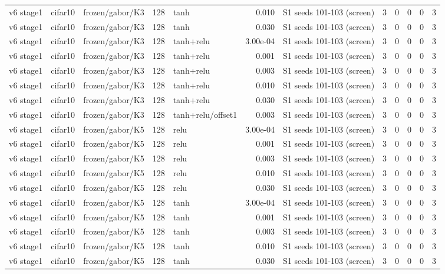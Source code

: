 \begin{table}[htbp]
{\begin{tabular}{@{}lllrlrlrrrrr@{}}
v6 stage1 & cifar10 & frozen/gabor/K3 & 128 & tanh & 0.010 & S1 seeds 101-103 (screen) & 3 & 0 & 0 & 0 & 3 \\
v6 stage1 & cifar10 & frozen/gabor/K3 & 128 & tanh & 0.030 & S1 seeds 101-103 (screen) & 3 & 0 & 0 & 0 & 3 \\
v6 stage1 & cifar10 & frozen/gabor/K3 & 128 & tanh+relu & 3.00e-04 & S1 seeds 101-103 (screen) & 3 & 0 & 0 & 0 & 3 \\
v6 stage1 & cifar10 & frozen/gabor/K3 & 128 & tanh+relu & 0.001 & S1 seeds 101-103 (screen) & 3 & 0 & 0 & 0 & 3 \\
v6 stage1 & cifar10 & frozen/gabor/K3 & 128 & tanh+relu & 0.003 & S1 seeds 101-103 (screen) & 3 & 0 & 0 & 0 & 3 \\
v6 stage1 & cifar10 & frozen/gabor/K3 & 128 & tanh+relu & 0.010 & S1 seeds 101-103 (screen) & 3 & 0 & 0 & 0 & 3 \\
v6 stage1 & cifar10 & frozen/gabor/K3 & 128 & tanh+relu & 0.030 & S1 seeds 101-103 (screen) & 3 & 0 & 0 & 0 & 3 \\
v6 stage1 & cifar10 & frozen/gabor/K3 & 128 & tanh+relu/offset1 & 0.003 & S1 seeds 101-103 (screen) & 3 & 0 & 0 & 0 & 3 \\
v6 stage1 & cifar10 & frozen/gabor/K5 & 128 & relu & 3.00e-04 & S1 seeds 101-103 (screen) & 3 & 0 & 0 & 0 & 3 \\
v6 stage1 & cifar10 & frozen/gabor/K5 & 128 & relu & 0.001 & S1 seeds 101-103 (screen) & 3 & 0 & 0 & 0 & 3 \\
v6 stage1 & cifar10 & frozen/gabor/K5 & 128 & relu & 0.003 & S1 seeds 101-103 (screen) & 3 & 0 & 0 & 0 & 3 \\
v6 stage1 & cifar10 & frozen/gabor/K5 & 128 & relu & 0.010 & S1 seeds 101-103 (screen) & 3 & 0 & 0 & 0 & 3 \\
v6 stage1 & cifar10 & frozen/gabor/K5 & 128 & relu & 0.030 & S1 seeds 101-103 (screen) & 3 & 0 & 0 & 0 & 3 \\
v6 stage1 & cifar10 & frozen/gabor/K5 & 128 & tanh & 3.00e-04 & S1 seeds 101-103 (screen) & 3 & 0 & 0 & 0 & 3 \\
v6 stage1 & cifar10 & frozen/gabor/K5 & 128 & tanh & 0.001 & S1 seeds 101-103 (screen) & 3 & 0 & 0 & 0 & 3 \\
v6 stage1 & cifar10 & frozen/gabor/K5 & 128 & tanh & 0.003 & S1 seeds 101-103 (screen) & 3 & 0 & 0 & 0 & 3 \\
v6 stage1 & cifar10 & frozen/gabor/K5 & 128 & tanh & 0.010 & S1 seeds 101-103 (screen) & 3 & 0 & 0 & 0 & 3 \\
v6 stage1 & cifar10 & frozen/gabor/K5 & 128 & tanh & 0.030 & S1 seeds 101-103 (screen) & 3 & 0 & 0 & 0 & 3 \\

\end{tabular}}
\end{table}
